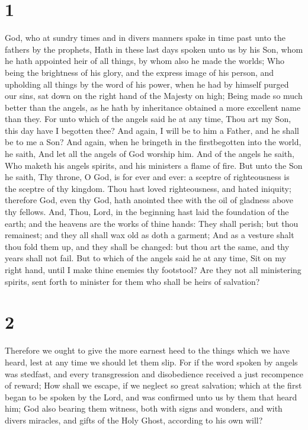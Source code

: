 \hypertarget{section}{%
\section{1}\label{section}}

 God, who at sundry times and in divers manners spake in
time past unto the fathers by the prophets,  Hath in these
last days spoken unto us by his Son, whom he hath appointed heir of all
things, by whom also he made the worlds;  Who being the
brightness of his glory, and the express image of his person, and
upholding all things by the word of his power, when he had by himself
purged our sins, sat down on the right hand of the Majesty on high;
 Being made so much better than the angels, as he hath by
inheritance obtained a more excellent name than they.  For
unto which of the angels said he at any time, Thou art my Son, this day
have I begotten thee? And again, I will be to him a Father, and he shall
be to me a Son?  And again, when he bringeth in the
firstbegotten into the world, he saith, And let all the angels of God
worship him.  And of the angels he saith, Who maketh his
angels spirits, and his ministers a flame of fire.  But unto
the Son he saith, Thy throne, O God, is for ever and ever: a sceptre of
righteousness is the sceptre of thy kingdom.  Thou hast
loved righteousness, and hated iniquity; therefore God, even thy God,
hath anointed thee with the oil of gladness above thy fellows.
 And, Thou, Lord, in the beginning hast laid the foundation
of the earth; and the heavens are the works of thine hands:
 They shall perish; but thou remainest; and they all shall
wax old as doth a garment;  And as a vesture shalt thou
fold them up, and they shall be changed: but thou art the same, and thy
years shall not fail.  But to which of the angels said he
at any time, Sit on my right hand, until I make thine enemies thy
footstool?  Are they not all ministering spirits, sent
forth to minister for them who shall be heirs of salvation?

\hypertarget{section-1}{%
\section{2}\label{section-1}}

 Therefore we ought to give the more earnest heed to the
things which we have heard, lest at any time we should let them slip.
 For if the word spoken by angels was stedfast, and every
transgression and disobedience received a just recompence of reward;
 How shall we escape, if we neglect so great salvation;
which at the first began to be spoken by the Lord, and was confirmed
unto us by them that heard him;  God also bearing them
witness, both with signs and wonders, and with divers miracles, and
gifts of the Holy Ghost, according to his own will?

